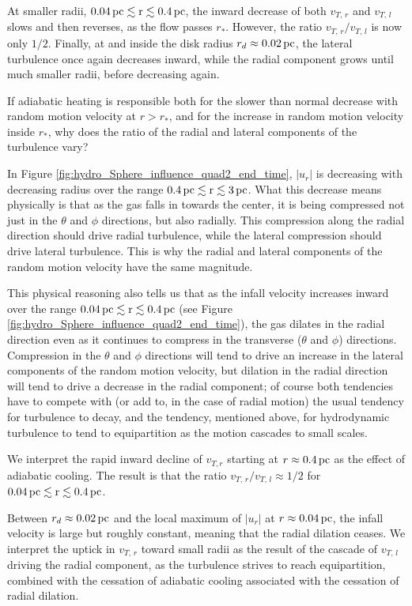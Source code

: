 \documentclass[../dissertation.tex]{subfiles}
\begin{document}
At smaller radii, $0.04\,\rm pc\lesssim r\lesssim0.4\,\rm pc$, the inward decrease of both 
$v_{T,\, r}$ and $v_{T, \, l}$ slows and then reverses, as the flow passes $r_*$. 
However, the ratio $v_{T,\, r}/v_{T, \, l}$ is now only $1/2$. 
Finally, at and inside the disk radius $r_d\approx 0.02\,\rm pc$, the lateral 
turbulence once again decreases inward, while the radial component 
grows until much smaller radii, before decreasing again. 

If adiabatic heating is responsible both for the slower than normal decrease with
random motion velocity at $r>r_*$, and for the increase in random motion velocity 
inside $r_*$, why does the ratio of the radial and lateral components of the 
turbulence vary? 

In Figure \ref{fig:hydro_Sphere_influence_quad2_end_time}, $|u_r|$ is
decreasing with decreasing radius over the range $0.4\,\rm pc\lesssim r\lesssim 3\,\rm pc$.
What this decrease means physically is that as the
gas falls in towards the center, it is being compressed not just
in the $\theta$ and $\phi$ directions, but also radially. This
compression along the radial direction should drive radial turbulence,
while the lateral compression should drive lateral
turbulence. This is why the radial and lateral components of the random motion
velocity have the same magnitude. 

This physical reasoning also tells us that as the infall velocity
increases inward over the range $0.04\,\rm pc\lesssim r\lesssim 0.4\,\rm pc$
(see Figure \ref{fig:hydro_Sphere_influence_quad2_end_time}), 
the gas dilates in the radial direction even as it continues to compress 
in the transverse ($\theta$ and $\phi$) directions. Compression in the
$\theta$ and $\phi$ directions will tend to drive an increase in the
lateral components of the random motion velocity, but dilation
in the radial direction will tend to drive a decrease in the radial
component; of course both tendencies have to compete with (or add to,
in the case of radial motion) the usual tendency for turbulence to
decay, and the tendency, mentioned above, for hydrodynamic turbulence
to tend to equipartition as the motion cascades to small scales. 

We interpret the rapid inward decline of $v_{T,r}$
starting at $r\approx0.4\,\rm pc$ as the effect of adiabatic cooling. The result
is that the ratio $v_{T,\, r}/v_{T,\, l}\approx 1/2$ for $0.04\,\rm pc\lesssim r\lesssim 0.4\,\rm pc$. 

Between $r_d\approx0.02\,\rm pc$ and the local maximum of $|u_r|$ at
$r\approx0.04\,\rm pc$, the infall velocity is large but roughly constant,
meaning that the radial dilation ceases. We interpret the uptick in
$v_{T,\, r}$ toward small radii as the result of the cascade of
$v_{T,\,l}$ driving the radial component, as the turbulence strives
to reach equipartition, combined with the cessation of adiabatic cooling 
associated with the cessation of radial dilation.  
\end{document}

